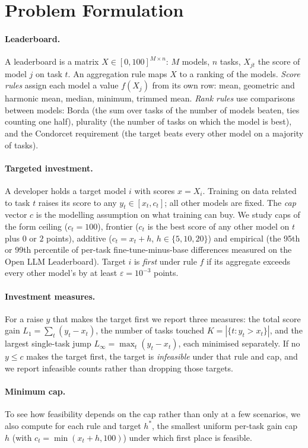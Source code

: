\section{Problem Formulation}
\label{sec:model}

\paragraph{Leaderboard.}
A leaderboard is a matrix $X\in[0,100]^{M\times n}$: $M$ models, $n$ tasks, $X_{jt}$ the score of model $j$ on task $t$. An aggregation rule maps $X$ to a ranking of the models. \emph{Score rules} assign each model a value $f(X_j)$ from its own row: mean, geometric and harmonic mean, median, minimum, trimmed mean. \emph{Rank rules} use comparisons between models: Borda (the sum over tasks of the number of models beaten, ties counting one half), plurality (the number of tasks on which the model is best), and the Condorcet requirement (the target beats every other model on a majority of tasks).

\paragraph{Targeted investment.}
A developer holds a target model $i$ with scores $x=X_i$. Training on data related to task $t$ raises its score to any $y_t\in[x_t,c_t]$; all other models are fixed. The \emph{cap} vector $c$ is the modelling assumption on what training can buy. We study caps of the form ceiling ($c_t=100$), frontier ($c_t$ is the best score of any other model on $t$ plus $0$ or $2$ points), additive ($c_t=x_t+h$, $h\in\{5,10,20\}$) and empirical (the 95th or 99th percentile of per-task fine-tune-minus-base differences measured on the Open LLM Leaderboard). Target $i$ is \emph{first} under rule $f$ if its aggregate exceeds every other model's by at least $\varepsilon=10^{-3}$ points.

\paragraph{Investment measures.}
For a raise $y$ that makes the target first we report three measures: the total score gain $L_1=\sum_t(y_t-x_t)$, the number of tasks touched $K=|\{t:y_t>x_t\}|$, and the largest single-task jump $L_\infty=\max_t(y_t-x_t)$, each minimised separately. If no $y\le c$ makes the target first, the target is \emph{infeasible} under that rule and cap, and we report infeasible counts rather than dropping those targets.

\paragraph{Minimum cap.}
To see how feasibility depends on the cap rather than only at a few scenarios, we also compute for each rule and target $h^\ast$, the smallest uniform per-task gain cap $h$ (with $c_t=\min(x_t+h,100)$) under which first place is feasible.
